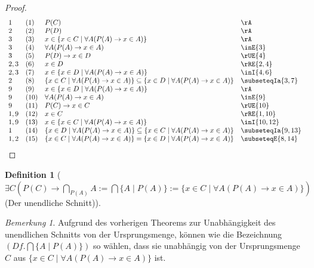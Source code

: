 \documentclass{book}
\theoremstyle{plain}
\theoremstyle{remark}
\newtheorem*{remark}{Bemerkung}
\theoremstyle{definition}
\newtheorem{definition}{Definition}[section]
\begin{document}
\begin{proof}
	\[
	\begin{array}{llll}
		1 & (1) & P(C) & \rA \\	
		2 & (2) & P(D) & \rA \\				
		3 & (3) & x\in \{x\in C\mid \forall A(P(A)\rightarrow x\in A)\} & \rA \\
		3 & (4) & \forall A(P(A)\rightarrow x\in A) & \inE{3} \\	
		3 & (5) & P(D)\rightarrow x\in D & \rUE{4} \\										
		2, 3 & (6) & x\in D & \rRE{2,4} \\
		2, 3 & (7) & x\in \{x\in D\mid \forall A(P(A)\rightarrow x\in A)\} & \inI{4,6} \\	
		2 & (8) & \{x\in C\mid \forall A(P(A)\rightarrow x\in A)\}\subseteq \{x\in D\mid \forall A(P(A)\rightarrow x\in A)\} & \subseteqIa{3,7} \\		
		9 & (9) & x\in \{x\in D\mid \forall A(P(A)\rightarrow x\in A)\} & \rA \\
		9 & (10) & \forall A(P(A)\rightarrow x\in A) & \inE{9} \\	
		9 & (11) & P(C)\rightarrow x\in C & \rUE{10} \\										
		1, 9 & (12) & x\in C & \rRE{1,10} \\
		1, 9 & (13) & x\in \{x\in C\mid \forall A(P(A)\rightarrow x\in A)\} & \inI{10,12} \\	
		1 & (14) & \{x\in D\mid \forall A(P(A)\rightarrow x\in A)\}\subseteq \{x\in C\mid \forall A(P(A)\rightarrow x\in A)\} & \subseteqIa{9,13} \\	
		1, 2 & (15) & \{x\in C\mid \forall A(P(A)\rightarrow x\in A)\}= \{x\in D\mid \forall A(P(A)\rightarrow x\in A)\} & \subseteqE{8,14} \\									
	\end{array}
	\]
	
\end{proof}

\begin{definition}[\(\exists C(P(C)\rightarrow \bigcap_{P(A)} A:=\bigcap \{ A \mid P(A) \} := \{ x\in C \mid \forall A(P(A)\rightarrow x\in A) \})\) (Der unendliche Schnitt)]
\end{definition}
\begin{remark}
	Aufgrund des vorherigen Theorems zur Unabhängigkeit des unendlichen Schnitts von der Ursprungsmenge, können wie die Bezeichnung \((Df. \bigcap \{A\mid P(A)\})\) so wählen, dass sie unabhängig von der Ursprungsmenge $C$ aus $\{ x\in C \mid \forall A(P(A)\rightarrow x\in A) \}$ ist.
\end{remark}
\end{document}
